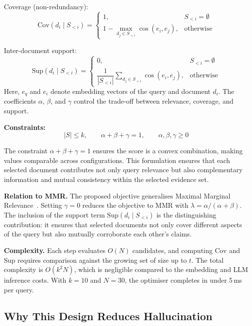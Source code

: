 \documentclass[conference]{IEEEtran}
\begin{document}
Coverage (non-redundancy):
\begin{equation}
\mathrm{Cov}(d_i \mid S_{<i}) =
\begin{cases}
1, & S_{<i} = \emptyset \\
1 - \max_{d_j \in S_{<i}} \cos(e_i, e_j), & \text{otherwise}
\end{cases}
\end{equation}

Inter-document support:
\begin{equation}
\mathrm{Sup}(d_i \mid S_{<i}) =
\begin{cases}
0, & S_{<i} = \emptyset \\
\dfrac{1}{|S_{<i}|} \sum_{d_j \in S_{<i}} \cos(e_i, e_j), & \text{otherwise}
\end{cases}
\end{equation}
Here, $e_q$ and $e_i$ denote embedding vectors of the query and document $d_i$. The coefficients $\alpha$, $\beta$, and $\gamma$ control the trade-off between relevance, coverage, and support.

\textbf{Constraints:}
\begin{equation}
|S| \leq k, \qquad \alpha + \beta + \gamma = 1, \qquad \alpha, \beta, \gamma \geq 0
\end{equation}

The constraint $\alpha + \beta + \gamma = 1$ ensures the score is a convex combination, making values comparable across configurations. This formulation ensures that each selected document contributes not only query relevance but also complementary information and mutual consistency within the selected evidence set.

\textbf{Relation to MMR.} The proposed objective generalises Maximal Marginal Relevance~\cite{10}. Setting $\gamma = 0$ reduces the objective to MMR with $\lambda = \alpha / (\alpha + \beta)$. The inclusion of the support term $\mathrm{Sup}(d_i \mid S_{<i})$ is the distinguishing contribution: it ensures that selected documents not only cover different aspects of the query but also mutually corroborate each other's claims.

\textbf{Complexity.} Each step evaluates $O(N)$ candidates, and computing $\mathrm{Cov}$ and $\mathrm{Sup}$ requires comparison against the growing set of size up to $t$. The total complexity is $O(k^2 N)$, which is negligible compared to the embedding and LLM inference costs. With $k = 10$ and $N = 30$, the optimiser completes in under 5\,ms per query.

\subsection{Why This Design Reduces Hallucination}
\end{document}
